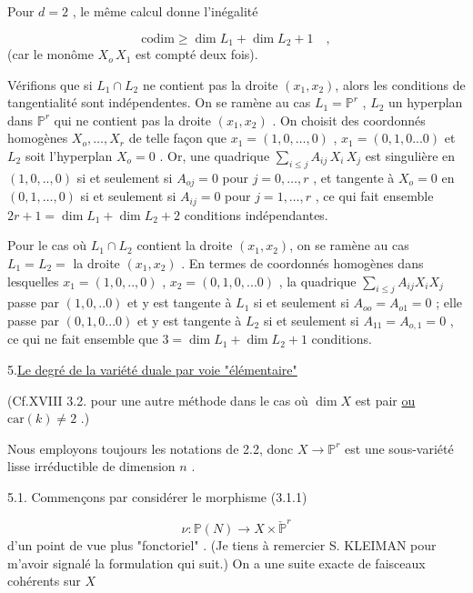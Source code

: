 Pour $d = 2$ , le même calcul donne l'inégalité

\begin{equation*}
\mathrm{codim} \geq \dim L_1 + \dim L_2 + 1 \quad ,
\end{equation*}
(car le monôme $X_o \, X_1$ est compté deux fois).

Vérifions que si $L_1 \cap L_2$ ne contient pas la droite $(x_1,x_2)$, alors les conditions de tangentialité sont indépendentes. On se ramène au cas $L_1 = \mathbb{P}^r$ , $L_2$ un hyperplan dans $\mathbb{P}^r$ qui ne contient pas la droite $(x_1,x_2)$ . On choisit des coordonnés homogènes $X_o,\ldots,X_r$ de telle façon que $x_1 = (1,0,\ldots,0)$ , $x_1 = (0,1,0...0)$ et $L_2$ soit l'hyperplan $X_o = 0$ . Or, une quadrique $\sum\limits_{i \leq j} A_{ij} \, X_i \, X_j$ est singulière en $(1,0,..,0)$ si et seulement si $A_{oj} = 0$ pour $j = 0,\ldots,r$ , et tangente à
$X_o = 0$ en $(0,1,\ldots,0)$ si et seulement si $A_{ij} = 0$ pour $j = 1,\ldots,r$ , ce qui fait ensemble $2r+1 = \dim L_1 + \dim L_2 + 2$ conditions indépendantes.

Pour le cas où $L_1 \cap L_2$ contient la droite $(x_1,x_2)$, on se ramène au cas $L_1 = L_2 =$ la droite $(x_1,x_2)$ . En termes de coordonnés homogènes dans lesquelles $x_1 = (1,0,..,0)$ , $x_2 = (0,1,0,...0)$ , la quadrique $\sum_{i \leq j} A_{ij} X_i X_j$ passe par $(1,0,..0)$ et y est tangente à $L_1$ si et seulement si $A_{oo} = A_{o1} = 0$ ; elle passe par $(0,1,0...0)$ et y est tangente à $L_2$ si et seulement si $A_{11} = A_{o,1} = 0$ , ce qui ne fait ensemble que $3 = \dim L_1 + \dim L_2 + 1$ conditions.


5.\quad \underline{Le degré de la variété duale par voie "élémentaire"}

(Cf.XVIII 3.2. pour une autre méthode dans le cas où $\dim X$ est pair \underline{ou} $\mathrm{car}(k) \neq 2$ .)

Nous employons toujours les notations de 2.2, donc $X \longrightarrow \mathbb{P}^r$ est une sous-variété lisse irréductible de dimension $n$ .

5.1. Commençons par considérer le morphisme (3.1.1)

\begin{equation}\tag{5.1.0}
\nu : \mathbb{P}(N) \longrightarrow X \times \check{\mathbb{P}}^r
\end{equation}
d'un point de vue plus "fonctoriel" . (Je tiens à remercier S. KLEIMAN pour m'avoir signalé la formulation qui suit.) On a une suite exacte
de faisceaux cohérents sur $X$

